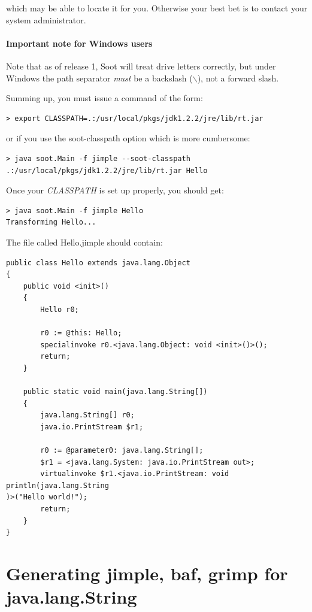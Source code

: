 \documentclass{article}
\begin{document}
which may be able to locate it for you.  Otherwise your best bet is to contact
your system administrator.

\paragraph{Important note for Windows users} Note that as of release 1,
Soot will treat drive letters correctly, but under Windows the path
separator {\em must} be a backslash ($\backslash$), not a forward slash.

Summing up, you must issue a command of the form:

\begin{verbatim}
> export CLASSPATH=.:/usr/local/pkgs/jdk1.2.2/jre/lib/rt.jar
\end{verbatim}

or if you use the soot-classpath option which is more cumbersome:

\begin{verbatim}
> java soot.Main -f jimple --soot-classpath .:/usr/local/pkgs/jdk1.2.2/jre/lib/rt.jar Hello
\end{verbatim}


Once your {\em CLASSPATH} is set up properly, you should get:

\begin{verbatim}
> java soot.Main -f jimple Hello
Transforming Hello...
\end{verbatim}

The file called Hello.jimple should contain:

\begin{verbatim}
public class Hello extends java.lang.Object
{
    public void <init>()
    {
        Hello r0;

        r0 := @this: Hello;
        specialinvoke r0.<java.lang.Object: void <init>()>();
        return;
    }

    public static void main(java.lang.String[])
    {
        java.lang.String[] r0;
        java.io.PrintStream $r1;

        r0 := @parameter0: java.lang.String[];
        $r1 = <java.lang.System: java.io.PrintStream out>;
        virtualinvoke $r1.<java.io.PrintStream: void println(java.lang.String
)>("Hello world!");
        return;
    }
}
\end{verbatim}

\section{Generating jimple, baf, grimp for java.lang.String}
\end{document}
